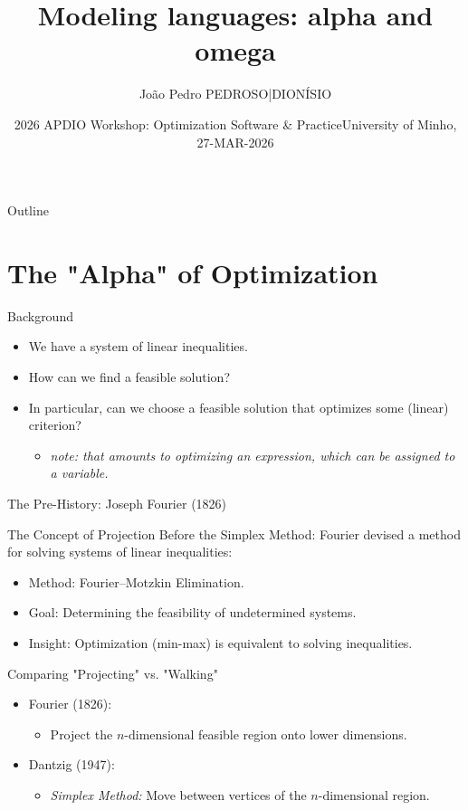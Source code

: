 \documentclass[presentation, aspectratio=169]{beamer}
\author{João Pedro PEDROSO|DIONÍSIO}
\date{\alert{\alert{2026 APDIO Workshop: Optimization Software \& Practice\newline University of Minho, 27-MAR-2026}}}
\title{Modeling languages: alpha and omega}
\institute[FCUP]{Faculty of Sciences, University of Porto}
\begin{document}
\maketitle
\begin{frame}{Outline}
\tableofcontents
\end{frame}


\section{The "Alpha" of Optimization}
\label{sec:orgd6eb28a}

\begin{frame}[label={sec:org2017199}]{Background}
\begin{itemize}
\item We have a system of linear inequalities.
\item How can we find a feasible solution?
\item In particular, can we choose a feasible solution that optimizes some (linear) criterion?
\begin{itemize}
\item \emph{note: that amounts to optimizing an expression, which can be assigned to a variable.}
\end{itemize}
\end{itemize}
\end{frame}


\begin{frame}[label={sec:orgb3d48dc}]{The Pre-History: Joseph Fourier (1826)}
\begin{block}{The Concept of Projection}
Before the Simplex Method: Fourier devised a method for solving systems of linear inequalities:
\begin{itemize}
\item \alert{\alert{Method}}: Fourier–Motzkin Elimination.
\item \alert{\alert{Goal}}: Determining the feasibility of undetermined systems.
\item \alert{\alert{Insight}}: Optimization (min-max) is equivalent to solving inequalities.
\end{itemize}
\end{block}
\end{frame}


\begin{frame}[label={sec:org4b22c02}]{Comparing "Projecting" vs. "Walking"}
\begin{itemize}
\item Fourier (1826):
\begin{itemize}
\item Project the \(n\text{-dimensional}\) feasible region onto lower dimensions.
\end{itemize}
\item Dantzig (1947):
\begin{itemize}
\item \emph{\alert{Simplex Method:}} Move between vertices of the \(n\text{-dimensional}\) region.
\end{itemize}
\end{itemize}
\end{frame}
\end{document}
